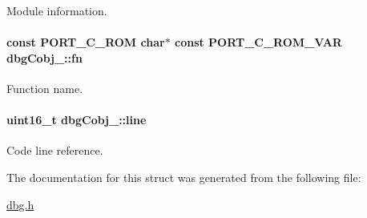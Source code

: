 Module information. 

\hypertarget{structdbgCobj___abc021a180df6778b04bdf68bed334521}{
\paragraph[{fn}]{\setlength{\rightskip}{0pt plus 5cm}const P\-O\-R\-T\-\_\-\-C\-\_\-\-R\-O\-M char$\ast$ const P\-O\-R\-T\-\_\-\-C\-\_\-\-R\-O\-M\-\_\-\-V\-A\-R dbg\-Cobj\-\_\-\-::fn}}\label{structdbgCobj___abc021a180df6778b04bdf68bed334521}


Function name. 

\hypertarget{structdbgCobj___a3eed823624880e32658ec0ec9d974e1e}{
\paragraph[{line}]{\setlength{\rightskip}{0pt plus 5cm}uint16\-\_\-t dbg\-Cobj\-\_\-\-::line}}\label{structdbgCobj___a3eed823624880e32658ec0ec9d974e1e}


Code line reference. 



The documentation for this struct was generated from the following file\-:\begin{DoxyCompactItemize}
\item 
\hyperlink{dbg_8h}{dbg.\-h}\end{DoxyCompactItemize}
